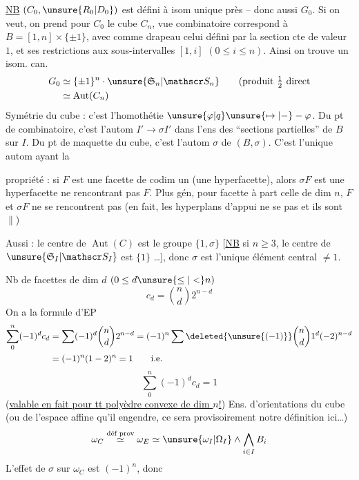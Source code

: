 \uline{NB} $(C_0,\unsure{R_0|D_0})$ est défini à isom unique près -- donc aussi $G_0$. Si on veut, on prend pour $C_0$ le cube  $C_n$,   vue combinatoire correspond à $B=[1,n]\times\{\pm1\}$, avec comme drapeau celui défini par la section cte de valeur $1$, et ses restrictions aux sous-intervalles $[1,i]$ $(0\leq i\leq n)$. Ainsi on trouve un isom. can.
\[
\begin{aligned}
G_0&\simeq\{\pm1\}^n\cdot\unsure{\mathfrak S_n|\mathscr S_n}
\qquad\text{(produit }\tfrac12\text{ direct}\\
&\simeq\operatorname{Aut}(C_n)
\end{aligned}
\]
Symétrie du cube : c'est l'homothétie $\unsure{\varphi|q}\unsure{\mapsto|-}-\varphi$. Du pt de  combinatoire, c'est l'autom $I'\to\sigma I'$ dans l'ens des ``sections partielles'' de $B$ sur $I$. Du pt de  maquette du cube, c'est l'autom $\sigma$ de $(B,\sigma)$. C'est l'unique autom  ayant la


propriété : si $F$ est une facette de codim un (une hyperfacette), alors $\sigma F$ est une hyperfacette ne  rencontrant pas $F$. Plus gén, pour   facette   à part celle de dim $n$, $F$ et $\sigma F$ ne se rencontrent pas (en fait, les hyperplans d'appui ne se  pas et ils sont $\parallel$)

Aussi : le centre de $\operatorname{Aut}(C)$ est le groupe $\{1,\sigma\}$ [\uline{NB} si $n\geq3$, le centre de $\unsure{\mathfrak S_I|\mathscr S_I}$ est $\{1\}$ \ldots], donc $\sigma$ est l'unique élément central $\ne1$.

Nb de facettes de dim $d$ $(0\leq d\unsure{\leq|<}n)$
\[
c_d=\binom nd2^{n-d}
\]
On a la formule d'EP
\[
\begin{aligned}
\sum_0^n(-1)^d c_d&=\sum(-1)^d\binom nd2^{n-d}=(-1)^n\sum\deleted{\unsure{(-1)}}\binom nd1^d(-2)^{n-d}\\
&=(-1)^n(1-2)^n=1\qquad\text{i.e.}
\end{aligned}
\]
\[
\boxed{\sum_0^n(-1)^d c_d=1}
\]
(\uline{valable en fait pour tt polyèdre convexe de dim $n$!})
Ens. d'orientations du cube (ou de l'espace affine qu'il engendre, ce sera provisoirement notre définition ici\ldots)
\[
\omega_C\overset{\text{déf prov}}{\simeq}\omega_E\simeq
\unsure{\omega_I|\Omega_I}\wedge\bigwedge_{i\in I}B_i
\]
L'effet de $\sigma$ sur $\omega_C$ est $(-1)^n$, donc

